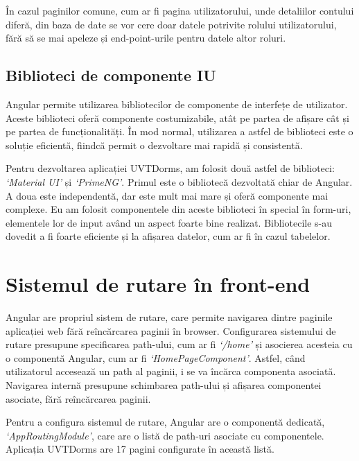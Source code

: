 \documentclass[12pt,a4paper]{report}
\theoremstyle{definition}
\theoremstyle{remark}
\begin{document}
\par În cazul paginilor comune, cum ar fi pagina utilizatorului, unde detaliilor contului diferă, din baza de date se vor cere doar datele potrivite rolului utilizatorului, fără să se mai apeleze și end-point-urile pentru datele altor roluri.

\subsection{Biblioteci de componente IU}

\par Angular permite utilizarea bibliotecilor de componente de interfețe de utilizator. Aceste biblioteci oferă componente costumizabile, atât pe partea de afișare cât și pe partea de funcționalități. În mod normal, utilizarea a astfel de biblioteci este o soluție eficientă, fiindcă permit o dezvoltare mai rapidă și consistentă.

\par Pentru dezvoltarea aplicației UVTDorms, am folosit două astfel de biblioteci: \textit{`Material UI'}\cite{material_ui_angular} și \textit{`PrimeNG'}\cite{prime_ng_home}. Primul este o bibliotecă dezvoltată chiar de Angular. A doua este independentă, dar este mult mai mare și oferă componente mai complexe. Eu am folosit componentele din aceste biblioteci în special în form-uri, elementele lor de input având un aspect foarte bine realizat. Bibliotecile s-au dovedit a fi foarte eficiente și la afișarea datelor, cum ar fi în cazul tabelelor. 

\section{Sistemul de rutare în front-end}

\par Angular are propriul sistem de rutare, care permite navigarea dintre paginile \textnormal{ap\-li\-ca\-ți\-ei} web fără reîncărcarea paginii în browser. Configurarea sistemului de rutare presupune specificarea path-ului, cum ar fi \textit{`/home'} și asocierea acesteia cu o componentă Angular, cum ar fi \textit{`HomePageComponent'}. Astfel, când utilizatorul accesează un path al paginii, i se va încărca componenta asociată. Navigarea internă presupune schimbarea path-ului și afișarea componentei asociate, fără reîncărcarea paginii.

\par Pentru a configura sistemul de rutare, Angular are o componentă dedicată, \textit{`AppRoutingModule'}, care are o listă de path-uri asociate cu componentele. Aplicația UVTDorms are 17 pagini configurate în această listă.
\end{document}
